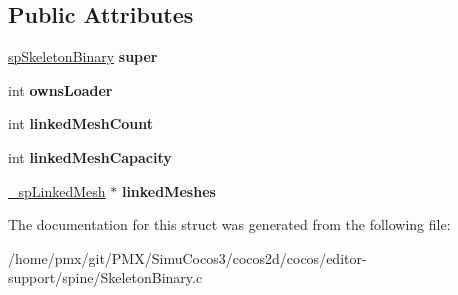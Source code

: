 \subsection*{Public Attributes}
\begin{DoxyCompactItemize}
\item 
\mbox{\label{struct__spSkeletonBinary_a2297163cee69912adeaae725b94b5238}} 
\hyperlink{structspSkeletonBinary}{sp\+Skeleton\+Binary} {\bfseries super}
\item 
\mbox{\label{struct__spSkeletonBinary_a93c4e8df9367e55bae619d1ffe686910}} 
int {\bfseries owns\+Loader}
\item 
\mbox{\label{struct__spSkeletonBinary_aca7ccb834c60979d9c975c19319186e0}} 
int {\bfseries linked\+Mesh\+Count}
\item 
\mbox{\label{struct__spSkeletonBinary_a8a030766ac370bbe50334c849258691c}} 
int {\bfseries linked\+Mesh\+Capacity}
\item 
\mbox{\label{struct__spSkeletonBinary_a4ae57b9cb03e81d31816129aa4e6bbbe}} 
\hyperlink{struct__spLinkedMesh}{\+\_\+sp\+Linked\+Mesh} $\ast$ {\bfseries linked\+Meshes}
\end{DoxyCompactItemize}


The documentation for this struct was generated from the following file\+:\begin{DoxyCompactItemize}
\item 
/home/pmx/git/\+P\+M\+X/\+Simu\+Cocos3/cocos2d/cocos/editor-\/support/spine/Skeleton\+Binary.\+c\end{DoxyCompactItemize}
